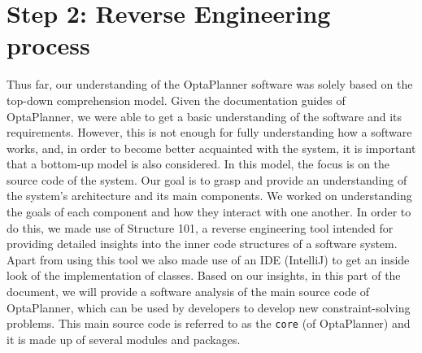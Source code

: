 \clearpage
\section{Step 2: Reverse Engineering process}
Thus far, our understanding of the OptaPlanner software was solely based on the top-down comprehension model. Given the documentation guides of OptaPlanner, we were able to get a basic understanding of the software and its requirements. However, this is not enough for fully understanding how a software works, and, in order to become better acquainted with the system, it is important that a bottom-up model is also considered. In this model, the focus is on the source code of the system. Our goal is to grasp and provide an understanding of the system’s architecture and its main components. We worked on understanding the goals of each component and how they interact with one another. In order to do this, we made use of Structure 101, a reverse engineering tool intended for providing detailed insights into the inner code structures of a software system. Apart from using this tool we also made use of an IDE (IntelliJ) to get an inside look of the implementation of classes. Based on our insights, in this part of the document, we will provide a software analysis of the main source code of OptaPlanner, which can be used by developers to develop new constraint-solving problems. This main source code is referred to as the \verb!core! (of OptaPlanner) and it is made up of several modules and packages. 
